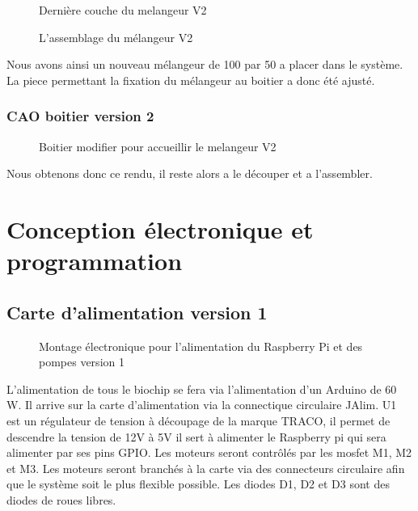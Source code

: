 \documentclass[a4paper, 11pt]{article}
\begin{document}
\begin{multicols}{2}
    \begin{figure}[H]
        \centering
        \caption{Dernière couche du melangeur V2}
        \label{fig: CAO_melangeur_V2_couche3}
    \end{figure}
    \begin{figure}[H]
        \centering
        \caption{L'assemblage du mélangeur V2}
        \label{fig:CAO_melangeur_V2}
    \end{figure}
\end{multicols}
Nous avons ainsi un nouveau mélangeur de 100 par 50 a placer dans le système. La piece permettant la fixation du mélangeur
au boitier a donc été ajusté.
\subsubsection{CAO boitier version 2}
\begin{figure}[H]
    \centering
    \caption{Boitier modifier pour accueillir le melangeur V2}
    \label{fig:CAO_boitier_V2}
\end{figure}
Nous obtenons donc ce rendu, il reste alors a le découper et a l'assembler.
\newpage
\section{Conception électronique et programmation}
\subsection{Carte d'alimentation version 1}
\begin{figure}[H]
    \centering
    \caption{Montage électronique pour l'alimentation du Raspberry Pi et des pompes version 1}
    \label{fig:CAO_electronique_V1}
\end{figure}
L'alimentation de tous le biochip se fera via l'alimentation d'un Arduino de 60 W.
Il arrive sur la carte d'alimentation via la connectique circulaire JAlim.
U1 est un régulateur de tension à découpage de la marque TRACO, il permet de descendre la tension de 12V à 5V il sert à alimenter le Raspberry pi qui sera alimenter par ses pins GPIO.
Les moteurs seront contrôlés par les mosfet M1, M2 et M3.
Les moteurs seront branchés à la carte via des connecteurs circulaire afin que le système soit le plus flexible possible.
Les diodes D1, D2 et D3 sont des diodes de roues libres.
\newpage
\end{document}
